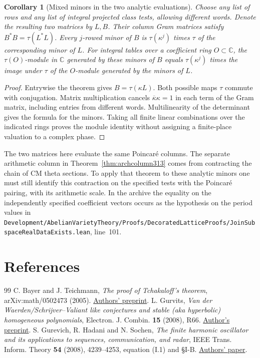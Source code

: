\documentclass[a4paper,11pt]{article}
\newtheorem{corollary}[proposition]{Corollary}
\theoremstyle{definition}
\theoremstyle{remark}
\newcommand{\srcloc}[2]{{\small\nolinkurl{#1.lean}}, line~#2}
\numberwithin{equation}{section}
\begin{document}
\begin{corollary}[Mixed minors in the two analytic evaluations]\leavevmode
\label{cor:mixedphase441}
Choose any list of rows and any list of integral projected class
tests, allowing different words. Denote the resulting two matrices
by \(L,B\). Their column Gram matrices satisfy
\(B^*B=\tau(L^*L)\). Every \(j\)-rowed minor of \(B\) is
\(\tau(\kappa^j)\) times \(\tau\) of the corresponding minor of
\(L\). For integral tables over a coefficient ring \(O\subset
\mathbb C\), the \(\tau(O)\)-module in \(\mathbb C\) generated by
these minors of \(B\) equals \(\tau(\kappa^j)\) times the image
under \(\tau\) of the \(O\)-module generated by the minors of \(L\).
\end{corollary}
\begin{proof}
Entrywise the theorem gives \(B=\tau(\kappa L)\). Both possible
maps \(\tau\) commute with conjugation. Matrix multiplication
cancels \(\overline\kappa\kappa=1\) in each term of the Gram
matrix, including entries from different words. Multilinearity
of the determinant gives the formula for the minors. Taking all
finite linear combinations over the indicated rings proves the
module identity without assigning a finite-place valuation to a
complex phase.
\end{proof}

The two matrices here evaluate the same Poincar\'e columns. The
separate arithmetic column in Theorem~\ref{thm:archcolumn313}
comes from contracting the chain of CM theta sections. To apply
that theorem to these analytic minors one must still identify
this contraction on the specified tests with the Poincar\'e
pairing, with its arithmetic scale. In the archive the equality
on the independently specified coefficient vectors occurs as the
hypothesis on the period values in
\srcloc{Development/AbelianVarietyTheory/Proofs/DecoratedLatticeProofs/JoinSubspaceRealDataExists}{101}.

\clearpage
\section{References}\label{nav:bibliography-XXIV}
\begingroup{}\begin{thebibliography}{99}\small
{} C. Bayer and J. Teichmann, \emph{The proof of Tchakaloff's theorem}, arXiv:math/0502473 (2005). \href{https://arxiv.org/abs/math/0502473}{Authors' preprint}.
 L. Gurvits, \emph{Van der Waerden/Schrijver--Valiant like conjectures and stable (aka hyperbolic) homogeneous polynomials}, Electron. J. Combin. \textbf{15} (2008), R66. \href{https://arxiv.org/abs/0711.3496}{Author's preprint}.
 S. Gurevich, R. Hadani and N. Sochen, \emph{The finite harmonic oscillator and its applications to sequences, communication, and radar}, IEEE Trans. Inform. Theory \textbf{54} (2008), 4239--4253, equation (I.1) and \S I-B. \href{https://people.math.wisc.edu/~sgurevich/IEEE-Journal.pdf}{Authors' paper}.
\end{thebibliography}\endgroup
\end{document}
